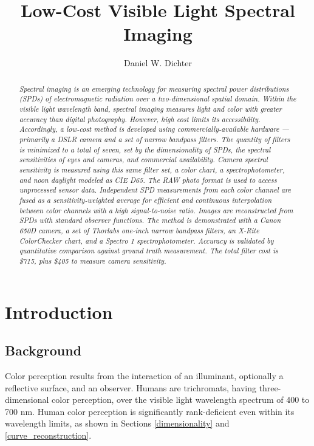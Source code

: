 \documentclass[twocolumn,10pt]{asme2ej}
\title{Low-Cost Visible Light Spectral Imaging}
\author{Daniel W. Dichter
    \affiliation{
Independent Researcher\\
Cambridge, Massachusetts, U.S.A.\\
daniel.w.dichter@gmail.com\\
\\
\color{red}
\emph{\textbf{DRAFT: \today}}\\
\color{black}

    }	
}
\begin{document}
\maketitle

\pagestyle{fancy}

\begin{abstract}{\it Spectral imaging is an emerging technology for measuring spectral power distributions (SPDs) of electromagnetic radiation over a two-dimensional spatial domain. Within the visible light wavelength band, spectral imaging measures light and color with greater accuracy than digital photography. However, high cost limits its accessibility. Accordingly, a low-cost method is developed using commercially-available hardware --- primarily a DSLR camera and a set of narrow bandpass filters. The quantity of filters is minimized to a total of seven, set by the dimensionality of SPDs, the spectral sensitivities of eyes and cameras, and commercial availability. Camera spectral sensitivity is measured using this same filter set, a color chart, a spectrophotometer, and noon daylight modeled as CIE D65. The RAW photo format is used to access unprocessed sensor data. Independent SPD measurements from each color channel are fused as a sensitivity-weighted average for efficient and continuous interpolation between color channels with a high signal-to-noise ratio. Images are reconstructed from SPDs with standard observer functions. The method is demonstrated with a Canon 650D camera, a set of Thorlabs one-inch narrow bandpass filters, an X-Rite ColorChecker chart, and a Spectro 1 spectrophotometer. Accuracy is validated by quantitative comparison against ground truth measurement. The total filter cost is \$715, plus \$405 to measure camera sensitivity.}
\end{abstract}

\section{Introduction}

\subsection{Background}


Color perception results from the interaction of an illuminant, optionally a reflective surface, and an observer. Humans are trichromats, having three-dimensional color perception, over the visible light wavelength spectrum of 400 to 700 nm. Human color perception is significantly rank-deficient even within its wavelength limits, as shown in Sections \ref{dimensionality} and \ref{curve_reconstruction}.
\end{document}
